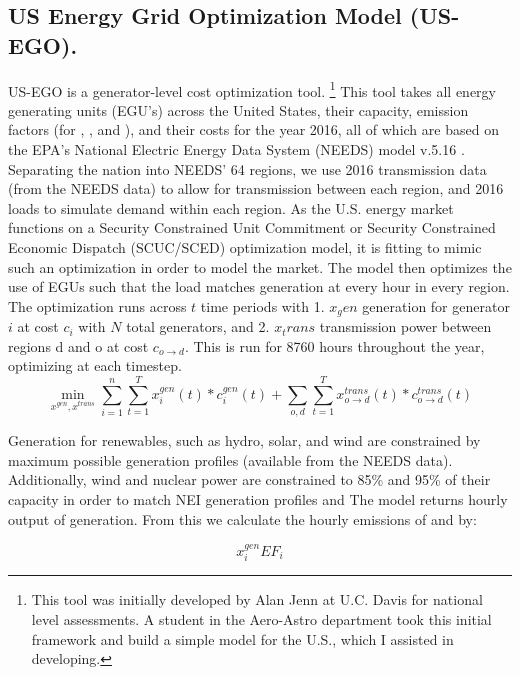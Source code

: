 \documentclass[12]{article}
\begin{document}
\subsection{US Energy Grid Optimization Model (US-EGO).}
US-EGO is a generator-level cost optimization tool. \footnote{This tool was initially developed by Alan Jenn at U.C. Davis for national level assessments. A student in the Aero-Astro department took this initial framework and build a simple model for the U.S., which I assisted in developing.} This tool takes all energy generating units (EGU's) across the United States, their capacity, emission factors (for , , and ), and their costs for the year 2016, all of which are based on the EPA's National Electric Energy Data System (NEEDS) model v.5.16 \citep{epa_power_2016}. Separating the nation into NEEDS' 64 regions, we use 2016 transmission data (from the NEEDS data) to allow for transmission between each region, and 2016 loads to simulate demand within each region. As the U.S. energy market functions on a Security Constrained Unit Commitment or Security Constrained Economic Dispatch (SCUC/SCED) optimization model, it is fitting to mimic such an optimization in order to model the market\citep{ela_evolution_2014}. The model then optimizes the use of EGUs such that the load matches generation at every hour in every region. The optimization runs across $t$ time periods with 1. $x_gen$ generation for generator $i$ at cost $c_i$ with $N$ total generators, and 2. $x_trans$ transmission power between regions d and o at cost $c_{o\rightarrow{}d}$. This is run for 8760 hours throughout the year, optimizing at each timestep. \citep{jenn_future_2018}
\begin{equation}
    \min\limits_{x^{gen}, x^{trans}}\sum_{i=1}^{n}\sum_{t=1}^{T} x^{gen}_{i}(t)*c^{gen}_{i}(t) + \sum_{o,d}\sum_{t=1}^{T} x^{trans}_{o\rightarrow{}d}(t)*c^{trans}_{o\rightarrow{}d}(t)
\end{equation}

Generation for renewables, such as hydro, solar, and wind are constrained by maximum possible generation profiles (available from the NEEDS data). Additionally, wind and nuclear power are constrained to 85\% and 95\% of their capacity in order to match NEI generation profiles and 
The model returns hourly output of generation. From this we calculate the hourly emissions of  and  by:

\begin{equation}
    x^{gen}_{i}EF_i
\end{equation}
\end{document}
